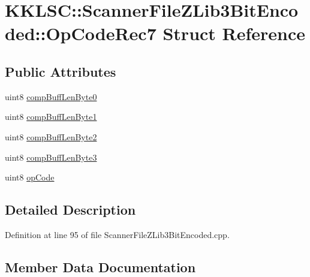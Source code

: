 \hypertarget{struct_scanner_file_z_lib3_bit_encoded_1_1_op_code_rec7}{}\section{K\+K\+L\+SC\+:\+:Scanner\+File\+Z\+Lib3\+Bit\+Encoded\+:\+:Op\+Code\+Rec7 Struct Reference}
\label{struct_scanner_file_z_lib3_bit_encoded_1_1_op_code_rec7}
\subsection*{Public Attributes}
\begin{DoxyCompactItemize}
\item 
uint8 \hyperlink{struct_scanner_file_z_lib3_bit_encoded_1_1_op_code_rec7_ac7a1bf295f06380266935a2c6618153a}{comp\+Buff\+Len\+Byte0}
\item 
uint8 \hyperlink{struct_scanner_file_z_lib3_bit_encoded_1_1_op_code_rec7_aa45a5de904215c93854cddfe8d993d80}{comp\+Buff\+Len\+Byte1}
\item 
uint8 \hyperlink{struct_scanner_file_z_lib3_bit_encoded_1_1_op_code_rec7_a150876ad1c9e3044cb4df52f4ee95e12}{comp\+Buff\+Len\+Byte2}
\item 
uint8 \hyperlink{struct_scanner_file_z_lib3_bit_encoded_1_1_op_code_rec7_a4824fd7bd3a1c186bb68d8b43fc8dbd2}{comp\+Buff\+Len\+Byte3}
\item 
uint8 \hyperlink{struct_scanner_file_z_lib3_bit_encoded_1_1_op_code_rec7_a4ae58affe48ce67b0e84549497955646}{op\+Code}
\end{DoxyCompactItemize}


\subsection{Detailed Description}


Definition at line 95 of file Scanner\+File\+Z\+Lib3\+Bit\+Encoded.\+cpp.



\subsection{Member Data Documentation}
